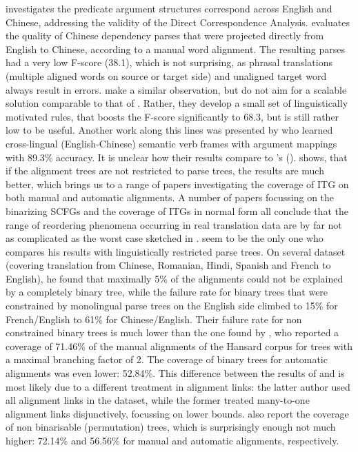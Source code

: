 \documentclass{report}
\theoremstyle{definition}
\theoremstyle{plain}
\def\citepos#1{\citeauthor{#1}'s (\citeyear{#1})}
\begin{document}
\cite{hwa2002evaluating} investigates the predicate argument structures correspond across English and Chinese, addressing the validity of the Direct Correspondence Analysis. \citeauthor{hwa2002evaluating} evaluates the quality of Chinese dependency parses that were projected directly from English to Chinese, according to a manual word alignment. The resulting parses had a very low F-score (38.1), which is not surprising, as phrasal translations (multiple aligned words on source or target side) and unaligned target word always result in errors. \cite{hwa2002evaluating} make a similar observation, but do not aim for a scalable solution comparable to that of \citeauthor{fox2002phrasal}. Rather, they develop a small set of linguistically motivated rules, that boosts the F-score significantly to 68.3, but is still rather low to be useful. Another work along this lines was presented by \cite{fung2006automatic} who learned cross-lingual (English-Chinese) semantic verb frames with argument mappings with 89.3\% accuracy. It is unclear how their results compare to \citepos{hwa2002evaluating}.
\cite{wellington2006empirical} shows, that if the alignment trees are not restricted to parse trees, the results are much better, which brings us to a range of papers investigating the coverage of ITG on both manual and automatic alignments. A number of papers focussing on the binarizing SCFGs \citep{zhang2006synchronous,huang2009binarization} and the coverage of ITGs in normal form \citep{sogaard2009empirical1,sogaard2009empirical2,sogaard2010can} all conclude that the range of reordering phenomena occurring in real translation data are by far not as complicated as the worst case sketched in \cite{satta2005some}. \cite{wellington2006empirical} seem to be the only one who compares his results with linguistically restricted parse trees. On several dataset (covering translation from Chinese, Romanian, Hindi, Spanish and French to English), he found that maximally 5\% of the alignments could not be explained by a completely binary tree, while the failure rate for binary trees that were constrained by monolingual parse trees on the English side climbed to 15\% for French/English to 61\% for Chinese/English. Their failure rate for non constrained binary trees is much lower than the one found by \cite{simaan2013hats}, who reported a coverage of 71.46\% of the manual alignments of the Hansard corpus for trees with a maximal branching factor of 2. The coverage of binary trees for automatic alignments was even lower: 52.84\%. This difference between the results of \cite{wellington2006empirical} and \cite{simaan2013hats} is most likely due to a different treatment in alignment links: the latter author used all alignment links in the dataset, while the former treated many-to-one alignment links disjunctively, focussing on lower bounds. \cite{simaan2013hats} also report the coverage of non binarisable (permutation) trees, which is surprisingly enough not much higher: 72.14\% and 56.56\% for manual and automatic alignments, respectively.
\end{document}
